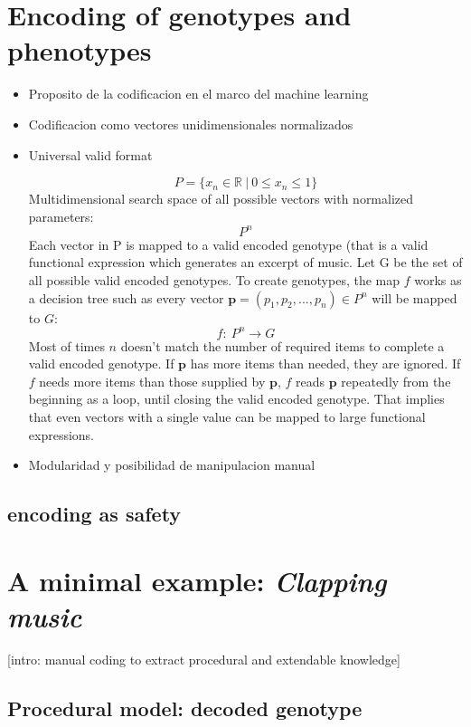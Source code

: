 \documentclass{article}
\renewcommand{\vec}[1]{\mathbf{#1}}
\begin{document}
\section{Encoding of genotypes and phenotypes}
\begin{itemize}
\item Proposito de la codificacion en el marco del machine learning
\item Codificacion como vectores unidimensionales normalizados
\item Universal valid format

$$ P = \{x_n \in \mathbb{R} \: | \: 0 \leq x_n \leq1 \} $$
Multidimensional search space of all possible vectors with normalized parameters:
$$ P^n $$
Each vector in P is mapped to a valid encoded genotype (that is a valid functional expression which generates an excerpt of music.
Let G be the set of all possible valid encoded genotypes. To create genotypes, the map $f$ works as a decision tree such as every vector $\vec{p} = (p_1, p_2, ..., p_n) \in P^n$ will be mapped to $G$: 
$$f:\ P^n\to G$$
Most of times $n$ doesn't match the number of required items to complete a valid encoded genotype. If $\vec{p}$ has more items than needed, they are ignored. If $f$ needs more items than those supplied by $\vec{p}$, $f$ reads $\vec{p}$ repeatedly from the beginning as a loop, until closing the valid encoded genotype. That implies that even vectors with a single value can be mapped to large functional expressions.  

\item Modularidad y posibilidad de manipulacion manual
\end{itemize}

\subsection{encoding as safety}



\section{A minimal example: \textsl{Clapping music}}

[intro: manual coding to extract procedural and extendable knowledge] 

\subsection{Procedural model: decoded genotype}
\end{document}
